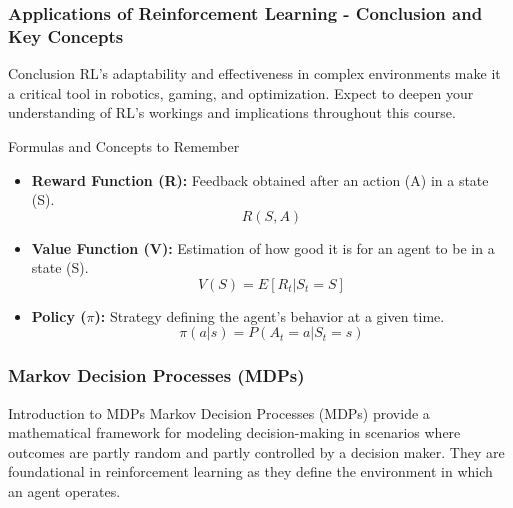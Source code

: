 \documentclass[aspectratio=169]{beamer}
\begin{document}
\begin{frame}[fragile]
    \frametitle{Applications of Reinforcement Learning - Conclusion and Key Concepts}
    \begin{block}{Conclusion}
        RL's adaptability and effectiveness in complex environments make it a critical tool in robotics, gaming, and optimization. Expect to deepen your understanding of RL's workings and implications throughout this course.
    \end{block}
    
    \begin{block}{Formulas and Concepts to Remember}
        \begin{itemize}
            \item \textbf{Reward Function (R):} Feedback obtained after an action (A) in a state (S).
            \begin{equation}
                R(S, A)
            \end{equation}
            \item \textbf{Value Function (V):} Estimation of how good it is for an agent to be in a state (S).
            \begin{equation}
                V(S) = E[R_t | S_t = S]
            \end{equation}
            \item \textbf{Policy ($\pi$):} Strategy defining the agent's behavior at a given time.
            \begin{equation}
                \pi(a|s) = P(A_t = a | S_t = s)
            \end{equation}
        \end{itemize}
    \end{block}
\end{frame}

\begin{frame}[fragile]
    \frametitle{Markov Decision Processes (MDPs)}
    \begin{block}{Introduction to MDPs}
        Markov Decision Processes (MDPs) provide a mathematical framework for modeling decision-making in scenarios where outcomes are partly random and partly controlled by a decision maker. They are foundational in reinforcement learning as they define the environment in which an agent operates.
    \end{block}
\end{frame}
\end{document}
